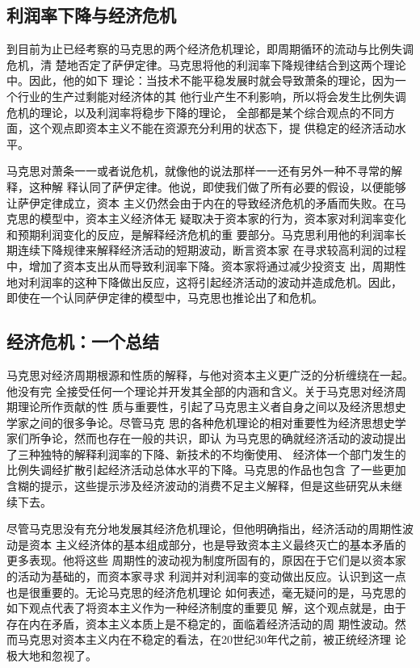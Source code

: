 \subsection{利润率下降与经济危机}

到目前为止已经考察的马克思的两个经济危机理论，即周期循环的流动与比例失调危机，清
楚地否定了萨伊定律。马克思将他的利润率下降规律结合到这两个理论中。因此，他的如下
理论：当技术不能平稳发展时就会导致萧条的理论，因为一个行业的生产过剩能对经济体的其
他行业产生不利影响，所以将会发生比例失调危机的理论，以及利润率将稳步下降的理论，
全部都是某个综合观点的不同方面，这个观点即资本主义不能在资源充分利用的状态下，提
供稳定的经济活动水平。

马克思对萧条一一或者说危机，就像他的说法那样一一还有另外一种不寻常的解释，这种解
释认同了萨伊定律。他说，即使我们做了所有必要的假设，以便能够让萨伊定律成立，资本
主义仍然会由于内在的导致经济危机的矛盾而失败。在马克思的模型中，资本主义经济体无
疑取决于资本家的行为，资本家对利润率变化和预期利润变化的反应，是解释经济危机的重
要部分。马克思利用他的利润率长期连续下降规律来解释经济活动的短期波动，断言资本家
在寻求较高利润的过程中，增加了资本支出从而导致利润率下降。资本家将通过减少投资支
出，周期性地对利润率的这种下降做出反应，这将引起经济活动的波动并造成危机。因此，
即使在一个认同萨伊定律的模型中，马克思也推论出了和危机。

\subsection{经济危机：一个总结}

马克思对经济周期根源和性质的解释，与他对资本主义更广泛的分析缠绕在一起。他没有完
全接受任何一个理论并开发其全部的内涵和含义。关于马克思对经济周期理论所作贡献的性
质与重要性，引起了马克思主义者自身之间以及经济思想史学家之间的很多争论。尽管马克
思的各种危机理论的相对重要性为经济思想史学家们所争论，然而也存在一般的共识，即认
为马克思的确就经济活动的波动提出了三种独特的解释利润率的下降、新技术的不均衡使用、
经济体一个部门发生的比例失调经扩散引起经济活动总体水平的下降。马克思的作品也包含
了一些更加含糊的提示，这些提示涉及经济波动的消费不足主义解释，但是这些研究从未继
续下去。

尽管马克思没有充分地发展其经济危机理论，但他明确指出，经济活动的周期性波动是资本
主义经济体的基本组成部分，也是导致资本主义最终灭亡的基本矛盾的更多表现。他将这些
周期性的波动视为制度所固有的，原因在于它们是以资本家的活动为基础的，而资本家寻求
利润并对利润率的变动做出反应。认识到这一点也是很重要的。无论马克思的经济危机理论
如何表述，毫无疑问的是，马克思的如下观点代表了将资本主义作为一种经济制度的重要见
解，这个观点就是，由于存在内在矛盾，资本主义本质上是不稳定的，面临着经济活动的周
期性波动。然而马克思对资本主义内在不稳定的看法，在20世纪30年代之前，被正统经济理
论极大地和忽视了。

